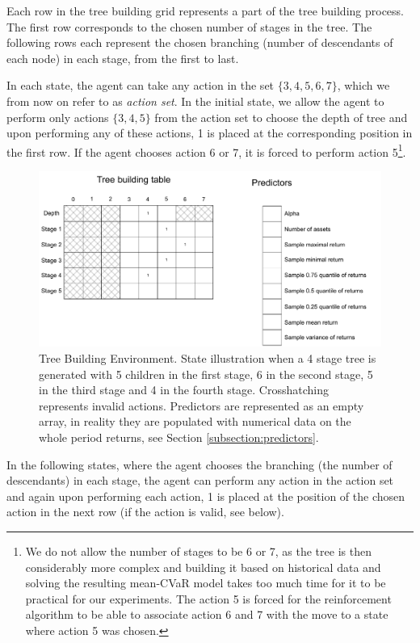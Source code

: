 Each row in the tree building grid represents a part of the tree building process. The first row corresponds to the chosen number of stages in the tree. The following rows each represent the chosen branching (number of descendants of each node) in each stage, from the first to last.

In each state, the agent can take any action in the set $\{3,4,5,6,7\}$, which we from now on refer to as \textit{action set}. In the initial state, we allow the agent to perform only actions $\{3,4,5\}$ from the action set to choose the depth of tree and upon performing any of these actions, 1 is placed at the corresponding position in the first row. If the agent chooses action 6 or 7, it is forced to perform action 5\footnote{We do not allow the number of stages to be 6 or 7, as the tree is then considerably more complex and building it based on historical data and solving the resulting mean-CVaR model takes too much time for it to be practical for our experiments. The action 5 is forced for the reinforcement algorithm to be able to associate action 6 and 7 with the move to a state where action 5 was chosen.}.


\begin{figure}[H]
  \includegraphics[width=\linewidth]{../img/Treebuildingenv_graph.pdf}
  \caption{Tree Building Environment. State illustration when a 4 stage tree is generated with 5 children in the first stage, 6 in the second stage, 5 in the third stage and 4 in the fourth stage. Crosshatching represents invalid actions. Predictors are represented as an empty array, in reality they are populated with numerical data on the whole period returns, see Section \ref{subsection:predictors}.}
  \label{fig:treebuildingenv}
\end{figure}


In the following states, where the agent chooses the branching (the number of descendants) in each stage, the agent can perform any action in the action set and again upon performing each action, 1 is placed at the position of the chosen action in the next row (if the action is valid, see below). 

